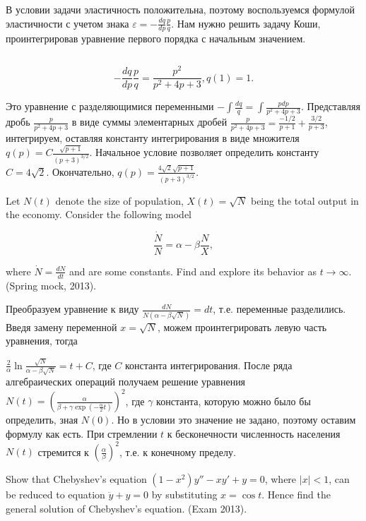 \begin{solution}
В условии задачи эластичность положительна, поэтому воспользуемся формулой эластичности с учетом знака $\varepsilon =-\frac{dq}{dp} \frac{p}{q} $. Нам нужно решить задачу Коши, проинтегрировав уравнение первого порядка с начальным значением.

$ $

\[-\frac{dq}{dp} \frac{p}{q} =\frac{p^{2} }{p^{2} +4p+3} , q(1)=1.\] 

Это уравнение с разделяющимися переменными $-\int \frac{dq}{q} =\int \frac{pdp}{p^{2} +4p+3}   $. Представляя дробь $\frac{p}{p^{2} +4p+3} $ в виде суммы элементарных дробей $\frac{p}{p^{2} +4p+3} =\frac{-1/2}{p+1} +\frac{3/2}{p+3} $, интегрируем, оставляя константу интегрирования в виде множителя $q(p)=C\frac{\sqrt{p+1} }{(p+3)^{3/2} } $. Начальное условие позволяет определить константу $C=4\sqrt{2} $. Окончательно, $q(p)=\frac{4\sqrt{2} \sqrt{p+1} }{(p+3)^{3/2} } $.
\end{solution}

\begin{problem}
Let $N(t)$ denote the size of population, $X(t)=\sqrt{N} $ being the total output in the economy. Consider the following model

\[\frac{\dot{N}}{N} =\alpha -\beta \frac{N}{X} ,\] 

where $\dot{N}=\frac{dN}{dt} $ and  are some constants. Find  and explore its behavior as $t\to \infty $. (Spring mock, 2013).
\end{problem}


\begin{solution}
Преобразуем уравнение к виду $\frac{dN}{N(\alpha -\beta \sqrt{N} )} =dt$, т.е. переменные разделились. Введя замену переменной $x=\sqrt{N} $, можем проинтегрировать левую часть уравнения, тогда

$\frac{2}{\alpha } \ln \frac{\sqrt{N} }{\alpha -\beta \sqrt{N} } =t+C$, где $C$ константа интегрирования. После ряда алгебраических операций получаем решение уравнения $N(t)=\left(\frac{\alpha }{\beta +\gamma \exp (-\frac{\alpha }{2} t)} \right)^{2} $, где $\gamma $ константа, которую можно было бы определить, зная $N(0)$. Но в условии это значение не задано, поэтому оставим формулу как есть. При стремлении $t$ к бесконечности численность населения $N(t)$ стремится к $\left(\frac{\alpha }{\beta } \right)^{2} $, т.е. к конечному пределу.
\end{solution}


\begin{problem}
Show that Chebyshev's equation $(1-x^{2} )y''-xy'+y=0$, where $\left|x\right|<1$, can be reduced to equation $\ddot{y}+y=0$ by substituting $x=\cos t$. Hence find the general solution of  Chebyshev's equation. (Exam 2013).
\end{problem}

